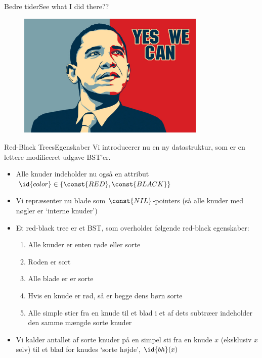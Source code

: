 \documentclass[aspectratio=1610]{beamer}
\begin{document}
\begin{frame}{Bedre tider}{See what I did there??}
    \begin{figure}[h]
        \centering
        \includegraphics[width=0.8\textwidth]{../yes-we-can}
    \end{figure}
\end{frame}



\begin{frame}{Red-Black Trees}{Egenskaber}
    Vi introducerer nu en ny datastruktur, som er en lettere modificeret udgave
    BST'er. \pause

    \begin{itemize}[<+(1)->]
        \item Alle knuder indeholder nu også en attribut $\id{color} \in \{
            \const{RED}, \const{BLACK} \}$
        \item Vi repræsenter nu blade som $\const{NIL}$-pointers (så alle knuder
            med nøgler er `interne knuder')
        \item Et red-black tree er et BST, som overholder følgende
            \alert{red-black egenskaber}:
            \begin{enumerate}
                \item Alle knuder er enten røde eller sorte
                \item Roden er sort
                \item Alle blade er er sorte
                \item Hvis en knude er rød, så er begge dens børn sorte
                \item Alle simple stier fra en knude til et blad i et af dets
                    subtræer indeholder den samme mængde sorte knuder
            \end{enumerate}
        \item Vi kalder antallet af sorte knuder på en simpel sti fra en knude
            $x$ (eksklusiv $x$ selv) til et blad for knudes `sorte højde',
            $\id{bh}(x)$
    \end{itemize}
\end{frame}
\end{document}
